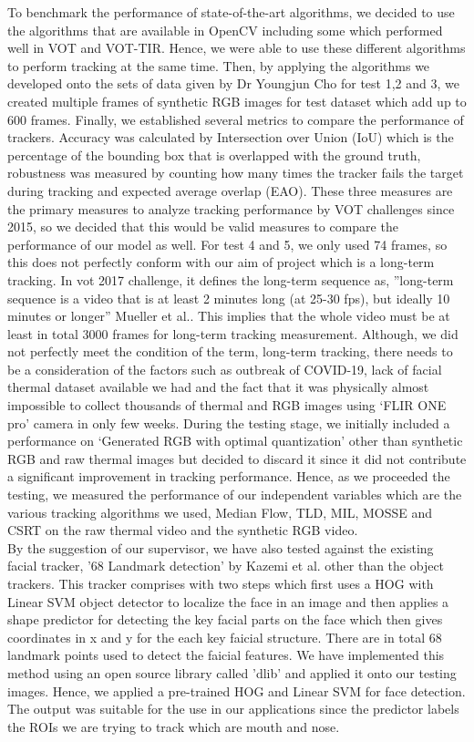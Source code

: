 \documentclass[conference]{IEEEtran}
\begin{document}
To benchmark the performance of state-of-the-art algorithms, we decided to use the algorithms that are available in OpenCV including some which performed well in VOT and VOT-TIR. Hence, we were able to use these different algorithms to perform tracking at the same time. Then, by applying the algorithms we developed onto the sets of data given by Dr Youngjun Cho for test 1,2 and 3, we created multiple frames of synthetic RGB images for test dataset which add up to 600 frames. Finally, we established several metrics to compare the performance of trackers. Accuracy was calculated by Intersection over Union (IoU) which is the percentage of the bounding box that is overlapped with the ground truth, robustness was measured by counting how many times the tracker fails the target during tracking and expected average overlap (EAO). These three measures are the primary measures to analyze tracking performance by VOT challenges since 2015\cite{b12}, so we decided that this would be valid measures to compare the performance of our model as well. For test 4 and 5, we only used 74 frames, so this does not perfectly conform with our aim of project which is a long-term tracking. In vot 2017 challenge, it defines the long-term sequence as, ”long-term sequence is a video that is at least 2 minutes long (at 25-30 fps), but ideally 10 minutes or longer” Mueller et al.\cite{b19}. This implies that the whole video must be at least in total 3000 frames for long-term tracking measurement. Although, we did not perfectly meet the condition of the term, long-term tracking, there needs to be a consideration of the factors such as outbreak of COVID-19, lack of facial thermal dataset available we had and the fact that it was physically almost impossible to collect thousands of thermal and RGB images using ‘FLIR ONE pro’ camera in only few weeks. During the testing stage, we initially included a performance on ‘Generated RGB with optimal quantization’ other than synthetic RGB and raw thermal images but decided to discard it since it did not contribute a significant improvement in tracking performance. Hence, as we proceeded the testing, we measured the performance of our independent variables which are the various tracking algorithms we used, Median Flow, TLD, MIL, MOSSE and CSRT on the raw thermal video and the synthetic RGB video.\\
By the suggestion of our supervisor, we have also tested against the existing facial tracker, '68 Landmark detection' by Kazemi et al.\cite{b21} other than the object trackers. This tracker comprises with two steps which first uses a HOG with Linear SVM object detector to localize the face in an image and then applies a shape predictor for detecting the key facial parts on the face which then gives coordinates in x and y for the each key faicial structure. There are in total 68 landmark points used to detect the faicial features. We have implemented this method using an open source library called 'dlib' and applied it onto our testing images. Hence, we applied a pre-trained HOG and Linear SVM for face detection. The output was suitable for the use in our applications since the predictor labels the ROIs we are trying to track which are mouth and nose.
\end{document}
